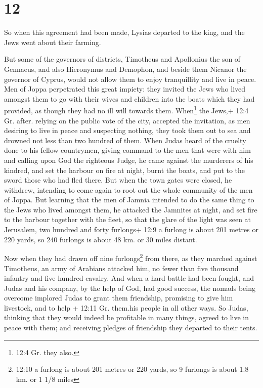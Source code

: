 \hypertarget{section-10}{%
\section{12}\label{section-10}}

 So when this agreement had been made, Lysias departed to
the king, and the Jews went about their farming.

 But some of the governors of districts, Timotheus and
Apollonius the son of Gennaeus, and also Hieronymus and Demophon, and
beside them Nicanor the governor of Cyprus, would not allow them to
enjoy tranquillity and live in peace.  Men of Joppa
perpetrated this great impiety: they invited the Jews who lived amongst
them to go with their wives and children into the boats which they had
provided, as though they had no ill will towards them. 
When\footnote{12:4 Gr. they also.} the Jews,+ 12:4 Gr. after. relying on
the public vote of the city, accepted the invitation, as men desiring to
live in peace and suspecting nothing, they took them out to sea and
drowned not less than two hundred of them.  When Judas heard
of the cruelty done to his fellow-countrymen, giving command to the men
that were with him  and calling upon God the righteous
Judge, he came against the murderers of his kindred, and set the harbour
on fire at night, burnt the boats, and put to the sword those who had
fled there.  But when the town gates were closed, he
withdrew, intending to come again to root out the whole community of the
men of Joppa.  But learning that the men of Jamnia intended
to do the same thing to the Jews who lived amongst them,  he
attacked the Jamnites at night, and set fire to the harbour together
with the fleet, so that the glare of the light was seen at Jerusalem,
two hundred and forty furlongs+ 12:9 a furlong is about 201 metres or
220 yards, so 240 furlongs is about 48 km. or 30 miles distant.

 Now when they had drawn off nine furlongs\footnote{12:10 a
  furlong is about 201 metres or 220 yards, so 9 furlongs is about 1.8
  km. or 1 1/8 miles} from there, as they marched against Timotheus, an
army of Arabians attacked him, no fewer than five thousand infantry and
five hundred cavalry.  And when a hard battle had been
fought, and Judas and his company, by the help of God, had good success,
the nomads being overcome implored Judas to grant them friendship,
promising to give him livestock, and to help + 12:11 Gr. them.his people
in all other ways.  So Judas, thinking that they would
indeed be profitable in many things, agreed to live in peace with them;
and receiving pledges of friendship they departed to their tents.

